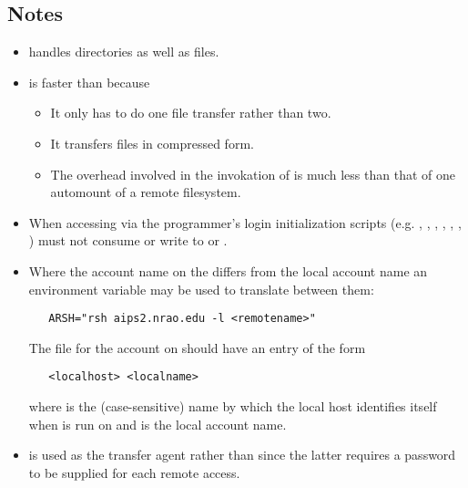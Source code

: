 \subsection*{Notes}
 
\begin{itemize}
\item
    handles directories as well as files.
 
\item
    is faster than  because
 
   \begin{itemize}
   \item
      It only has to do one file transfer rather than two.
 
   \item
      It transfers files in compressed form.
 
   \item
      The overhead involved in the invokation of  is much less
      than that of one automount of a remote filesystem.
   \end{itemize}
 
\item
   When accessing  via  the programmer's
   login initialization scripts (e.g. , ,
   , , , , )
   must not consume  or write to  or .
 
\item
   Where the account name on the  differs from the local
   account name an environment variable may be used to translate between them:
 
\begin{verbatim}
   ARSH="rsh aips2.nrao.edu -l <remotename>"
\end{verbatim}
 
   \noindent
   The  file for the  account on
    should have an entry of the form
 
\begin{verbatim}
   <localhost> <localname>
\end{verbatim}
 
   \noindent
   where  is the (case-sensitive) name by which the local
   host identifies itself when  is run on
    and  is the local account name.
 
\item
    is used as the transfer agent rather than  since
   the latter requires a password to be supplied for each remote access.
\end{itemize}
 
